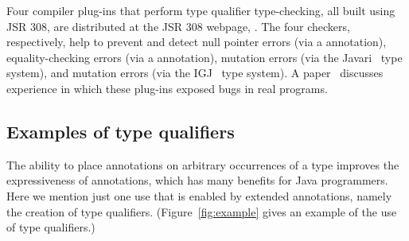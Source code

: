 \documentclass[10pt]{article}
\begin{document}
Four compiler plug-ins that perform type qualifier type-checking, all built
using JSR 308, are distributed at the JSR 308 webpage,
.  The four checkers, respectively,
help to prevent and detect null pointer errors (via a 
annotation), equality-checking errors (via a  annotation),
mutation errors (via the Javari~\cite{BirkaE2004,TschantzE2005} type
system), and mutation errors (via the IGJ~\cite{ZibinPAAKE2007} type
system).  A paper~\cite{PapiACPE2008} discusses experience
in which these plug-ins exposed bugs in real programs.


\subsection{Examples of type qualifiers\label{type-qualifier-examples}}

The ability to place annotations on arbitrary occurrences of a type
improves the expressiveness of annotations, which has many benefits for
Java programmers.  Here we mention just one use that is enabled by extended
annotations, namely the creation of type qualifiers.
(Figure~\ref{fig:example} gives an example of the use of type qualifiers.)
\end{document}
